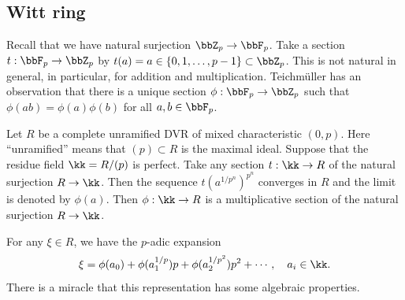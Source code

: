 \subsection{Witt ring}

Recall that we have natural surjection $\bbZ_p \to \bbF_p$.
Take a section $t: \bbF_p \to \bbZ_p$ by $t(a)= a \in \{0, 1, \ldots, p-1\} \subset \bbZ_p$.
This is not natural in general, in particular, for addition and multiplication.
Teichmüller has an observation that there is a unique section $\phi: \bbF_p \to \bbZ_p$ such that $\phi(ab) = \phi(a)\phi(b)$ for all $a, b \in \bbF_p$.

Let $R$ be a complete unramified DVR of mixed characteristic $(0, p)$.
Here ``unramified'' means that $(p) \subset R$ is the maximal ideal.
Suppose that the residue field $\kk = R/(p)$ is perfect.
Take any section $t: \kk \to R$ of the natural surjection $R \to \kk$.
Then the sequence $t(a^{1/p^n})^{p^n}$ converges in $R$ and the limit is denoted by $\phi(a)$.
Then $\phi: \kk \to R$ is a multiplicative section of the natural surjection $R \to \kk$.

For any $\xi \in R$, we have the $p$-adic expansion
\[ \xi = \phi(a_0) + \phi(a_1^{1/p})p + \phi(a_2^{1/p^2})p^2 + \cdots, \quad a_i \in \kk. \]
There is a miracle that this representation has some algebraic properties.

